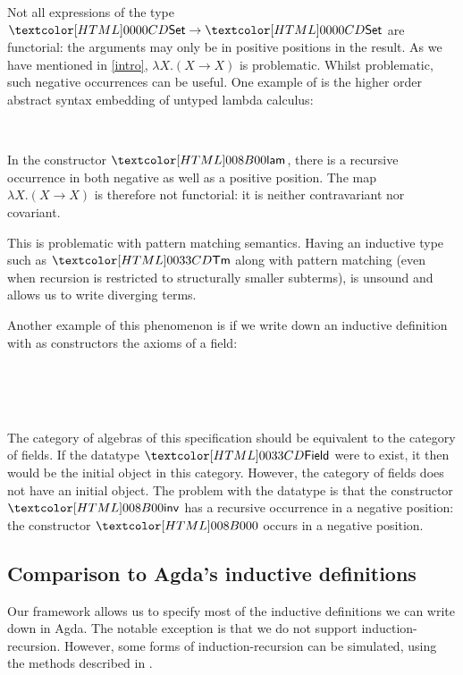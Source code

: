 Not all expressions of the type $\Set \to \Set$ are functorial: the
arguments may only be in positive positions in the result. As we have
mentioned in \cref{intro}, $\lambda X . (X \to X)$ is
problematic. Whilst problematic, such negative occurrences can be
useful. One example of is the higher order abstract syntax embedding
of untyped lambda calculus:
%
\begin{datatype}{\tttmty}{\Set}
  \constr{\ttapp}{\tttmty \to \tttmty \to \tttmty} \\
  \constr{\ttlam}{(\tttmty \to \tttmty) \to \tttmty}
\end{datatype}
%
In the constructor $\ttlam$, there is a recursive occurrence in both
negative as well as a positive position. The map
$\lambda X . (X \to X)$ is therefore not functorial: it is neither
contravariant nor covariant. 

This is problematic with pattern matching semantics. Having an
inductive type such as $\tttmty$ along with pattern matching (even
when recursion is restricted to structurally smaller subterms), is
unsound and allows us to write diverging terms.

Another example of this phenomenon is if we write down an inductive
definition with as constructors the axioms of a field:
%
\begin{datatype}{\fieldty}{\Set}
  \constr{\fieldzero}{\fieldty} \\
  \constrdots \\
   \\
  \constrdots
\end{datatype}
%
The category of algebras of this specification should be equivalent to
the category of fields. If the datatype $\fieldty$ were to exist, it
then would be the initial object in this category. However, the
category of fields does not have an initial object. The problem with
the datatype is that the constructor $\fieldinv$ has a recursive
occurrence in a negative position: the constructor $\fieldzero$ occurs
in a negative position.

\subsection{Comparison to Agda's inductive definitions}
Our framework allows us to specify most of the inductive definitions
we can write down in Agda. The notable exception is that we do not
support induction-recursion. However, some forms of
induction-recursion can be simulated, using the methods described in
\cite{Hancock2013}.

